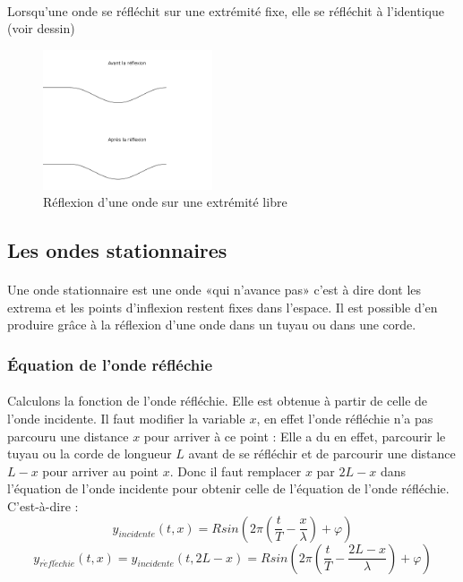 \documentclass[a4paper]{article}
\begin{document}
\paragraph{}Lorsqu'une onde se réfléchit sur une extrémité fixe, elle se réfléchit à l'identique (voir dessin)
\begin{figure}
\begin{center}
\includegraphics[width=5cm]{imgs/refllibre.png}
\end{center}
\caption{Réflexion d'une onde sur une extrémité libre}
\label{Réflexion d'une onde sur une extrémité libre}
\end{figure}
\subsection{Les ondes stationnaires}
\paragraph{}Une onde stationnaire est une onde «qui n'avance pas» c'est à dire dont les extrema et les points d'inflexion restent fixes dans l'espace. Il est possible d'en produire grâce à la réflexion d'une onde dans un tuyau ou dans une corde.
\subsubsection{Équation de l'onde réfléchie}
\paragraph{}Calculons la fonction de l'onde réfléchie. Elle est obtenue à partir de celle de l'onde incidente. Il faut modifier la variable $x$, en effet l'onde réfléchie n'a pas parcouru une distance $x$ pour arriver à ce point : Elle a du en effet, parcourir le tuyau ou la corde de longueur $L$ avant de se réfléchir et de parcourir une distance $L-x$ pour arriver au point $x$. Donc il faut remplacer $x$ par $2L-x$ dans l'équation de l'onde incidente pour obtenir celle de l'équation de l'onde réfléchie. C'est-à-dire :  
\[y_{incidente}(t,x)=Rsin\left(2\pi \left(\frac{t}{T}-\frac{x}{\lambda}\right)+\varphi\right)\]
\[y_{r\acute{e}fl\acute{e}chie}(t,x)=y_{incidente}(t,2L-x)=Rsin\left(2\pi \left(\frac{t}{T}-\frac{2L-x}{\lambda}\right)+\varphi\right)\]
\end{document}
